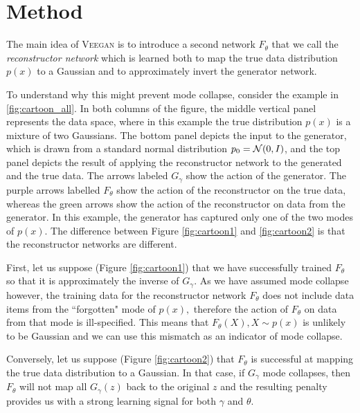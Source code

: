 \documentclass{article}
\newcommand{\acronym}{\textsc{Veegan}\xspace}
\newcommand{\reconstructor}{reconstructor network\xspace}
\newcommand{\comment}[1]{} %
\newcommand{\MG}[1]{\comment{\textcolor{Orange}{\textit{\lbrack MG: #1 \rbrack}}}}
\begin{document}
\section{Method}
\MG{Serious re-write: please check that you are ok with it and that I didn't say anything stupid or wrong}

The main idea of \acronym is to introduce a second network $F_\theta$
that we call the \emph{\reconstructor} which is learned  both to map the
true data distribution $p(x)$ to a Gaussian and to approximately invert
the generator network.

To understand why this might
prevent mode collapse, consider the example in
\autoref{fig:cartoon_all}. In both columns of the figure, the middle
vertical panel represents the data space, where in this example the
true distribution $p(x)$ is a mixture of two Gaussians.  The bottom
panel depicts the input to the generator, which is drawn from a
standard normal distribution $p_0= \mathcal{N}(0, I)$,
and the top panel depicts the result of applying
the reconstructor network to the generated
and the true data. The arrows labeled
 $G_\gamma$ show the action of the generator. The purple arrows labelled $F_\theta$ show the action of the reconstructor on the true data,
 whereas the green arrows show the action of the reconstructor on data from the generator. In this example, the
generator has captured only one of the two modes of $p(x)$. The difference between Figure \ref{fig:cartoon1} and \ref{fig:cartoon2} is that the reconstructor networks
are different.

First, let us suppose (Figure \ref{fig:cartoon1}) that we have successfully
trained $F_\theta$ so that it is approximately
the inverse of $G_\gamma$. As we have assumed mode collapse
however, the training data for the reconstructor network $F_\theta$
does not include data items from the ``forgotten" mode of $p(x),$ therefore
 the action of $F_\theta$ on data from that mode is
ill-specified. This means that $F_\theta(X), X \sim p(x)$ is unlikely
to be Gaussian and we can use this mismatch as an indicator of mode
collapse.

Conversely, let us suppose (Figure \ref{fig:cartoon2}) that $F_\theta$ is
successful at mapping the true data distribution 
to a Gaussian.  In that case, if
$G_\gamma$ mode collapses, then $F_\theta$ will not map all $G_\gamma(z)$ back to the original $z$
and the resulting penalty provides us with a strong learning signal
for both $\gamma$ and $\theta$. 
\end{document}
